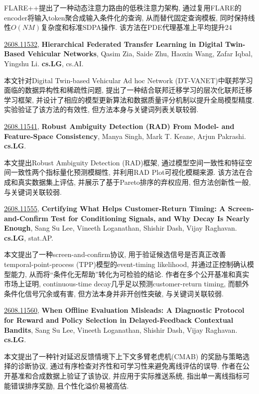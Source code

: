 \documentclass[9pt, a4paper]{article}
\theoremstyle{plain}
\theoremstyle{definition}
\theoremstyle{remark}
\newcommand{\arxivwithtarget}[3]{\hypertarget{#1}{}\href{https://arxiv.org/abs/#1}{#1}, \textbf{\textcolor{arxivblue}{#2}}, #3. }
\begin{document}
FLARE++提出了一种动态注意力路由的低秩注意力架构, 通过复用FLARE的encoder将输入token聚合成输入条件化的查询, 从而替代固定查询模板, 同时保持线性$O(NM)$复杂度和标准SDPA操作. 该方法在PDE代理基准上平均提升24%


\arxivwithtarget{2608.11532}{Hierarchical Federated Transfer Learning in Digital Twin-Based Vehicular Networks}{Qasim Zia, Saide Zhu, Haoxin Wang, Zafar Iqbal, Yingshu Li}\textbf{cs.LG}, cs.AI.

本文针对Digital Twin-based Vehicular Ad hoc Network (DT-VANET)中联邦学习面临的数据异构性和稀疏性问题, 提出了一种结合联邦迁移学习的层次化联邦迁移学习框架, 并设计了相应的模型更新算法和数据质量评分机制以提升全局模型精度. 实验验证了该方法的有效性, 但方法本身与关键词列表关联较弱.


\arxivwithtarget{2608.11541}{Robust Ambiguity Detection (RAD) From Model- and Feature-Space Consistency}{Manya Singh, Mark T. Keane, Arjun Pakrashi}\textbf{cs.LG}.

本文提出Robust Ambiguity Detection (RAD)框架, 通过模型空间一致性和特征空间一致性两个指标量化预测模糊性, 并利用RAD Plot可视化模糊来源. 该方法在合成和真实数据集上评估, 并展示了基于Pareto排序的弃权应用, 但方法创新性一般, 与关键词关联较弱.


\arxivwithtarget{2608.11555}{Certifying What Helps Customer-Return Timing: A Screen-and-Confirm Test for Conditioning Signals, and Why Decay Is Nearly Enough}{Sang Su Lee, Vineeth Loganathan, Shishir Dash, Vijay Raghavan}\textbf{cs.LG}, stat.AP.

本文提出了一种screen-and-confirm协议, 用于验证候选信号是否真正改善temporal-point-process (TPP)模型的event-timing likelihood, 并通过正控制确认模型能力, 从而将“条件化无帮助”转化为可检验的结论. 作者在多个公开基准和真实市场上证明, continuous-time decay几乎足以预测customer-return timing, 而额外条件化信号冗余或有害, 但方法本身并非开创性突破, 与关键词关联较弱.


\arxivwithtarget{2608.11560}{When Offline Evaluation Misleads: A Diagnostic Protocol for Reward and Policy Selection in Delayed-Feedback Contextual Bandits}{Sang Su Lee, Vineeth Loganathan, Shishir Dash, Vijay Raghavan}\textbf{cs.LG}.

本文提出了一种针对延迟反馈情境下上下文多臂老虎机(CMAB) 的奖励与策略选择的诊断协议, 通过有序检查对齐性和可学习性来避免离线评估的误导. 作者在公开基准和合成数据上验证了该协议, 并应用于实际推送系统, 指出单一离线指标可能错误排序奖励, 且个性化溢价易被高估.
\end{document}
